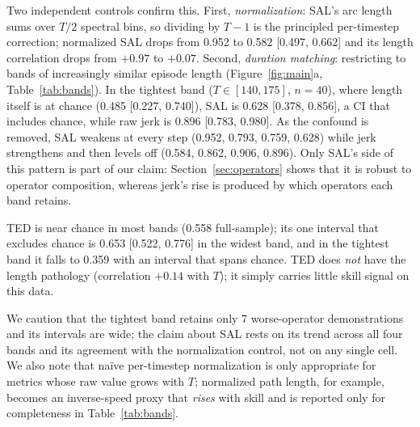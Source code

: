 \documentclass[10pt]{article}
\begin{document}
Two independent controls confirm this. First, \emph{normalization}: SAL's
arc length sums over $T/2$ spectral bins, so dividing by $T{-}1$ is the
principled per-timestep correction; normalized SAL drops from 0.952 to 0.582
[0.497, 0.662] and its length correlation drops from $+0.97$ to $+0.07$.
Second, \emph{duration matching}: restricting to bands of increasingly
similar episode length (Figure~\ref{fig:main}a, Table~\ref{tab:bands}). In
the tightest band ($T \in [140,175]$, $n{=}40$), where length itself is at
chance (0.485 [0.227, 0.740]), SAL is 0.628 [0.378, 0.856], a CI that
includes chance, while raw jerk is 0.896 [0.783, 0.980]. As the confound
is removed, SAL weakens at every step (0.952, 0.793, 0.759, 0.628) while
jerk strengthens and then levels off (0.584, 0.862, 0.906, 0.896). Only
SAL's side of this pattern is part of our claim: Section~\ref{sec:operators}
shows that it is robust to operator composition, whereas jerk's rise is
produced by which operators each band retains.

TED is near chance in most bands (0.558 full-sample); its one interval that
excludes chance is 0.653 [0.522, 0.776] in the widest band, and in the
tightest band it falls to 0.359 with an interval that spans chance. TED
does \emph{not} have the length pathology (correlation $+0.14$ with $T$);
it simply carries little skill signal on this data.

We caution that the tightest band retains only 7 worse-operator
demonstrations and its intervals are wide; the claim about SAL rests on its
trend across all four bands and its agreement with the normalization
control, not on any single cell. We also note that na\"ive per-timestep
normalization is only appropriate for metrics whose raw value grows with
$T$; normalized path length, for example, becomes an inverse-speed proxy
that \emph{rises} with skill and is reported only for completeness in
Table~\ref{tab:bands}.
\end{document}
